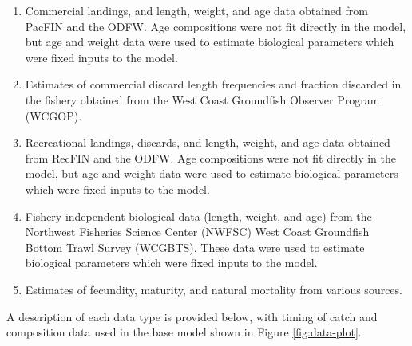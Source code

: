 \documentclass[11pt,
  english,
  a4paper,
]{article}
\begin{document}

\begin{enumerate}
\def\labelenumi{\arabic{enumi}.}
\item

  Commercial landings, and length, weight, and age data obtained from PacFIN and the ODFW. Age compositions were not fit directly in the model, but age and weight data were used to estimate biological parameters which were fixed inputs to the model.

  \tagmcend\tagstructend\tagstructend
\item

  Estimates of commercial discard length frequencies and fraction discarded in the fishery obtained from the West Coast Groundfish Observer Program (WCGOP).

  \tagmcend\tagstructend\tagstructend
\item

  Recreational landings, discards, and length, weight, and age data obtained from RecFIN and the ODFW. Age compositions were not fit directly in the model, but age and weight data were used to estimate biological parameters which were fixed inputs to the model.

  \tagmcend\tagstructend\tagstructend
\item

  Fishery independent biological data (length, weight, and age) from the Northwest Fisheries Science Center (NWFSC) West Coast Groundfish Bottom Trawl Survey (WCGBTS). These data were used to estimate biological parameters which were fixed inputs to the model.

  \tagmcend\tagstructend\tagstructend
\item

  Estimates of fecundity, maturity, and natural mortality from various sources.

  \tagmcend\tagstructend\tagstructend
\end{enumerate}

\tagstructend


A description of each data type is provided below, with timing of catch and composition data used in the base model shown in Figure \ref{fig:data-plot}.
\end{document}
